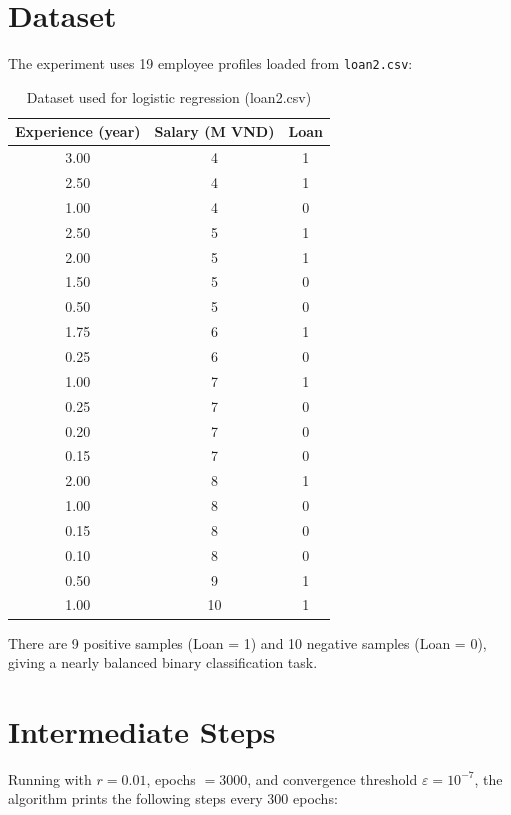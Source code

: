 \documentclass[12pt,a4paper]{article}
\begin{document}
\section{Dataset}

The experiment uses 19 employee profiles loaded from \texttt{loan2.csv}:

\begin{table}[H]
\centering
\caption{Dataset used for logistic regression (loan2.csv)}
\begin{tabular}{ccc}
\toprule
\textbf{Experience (year)} & \textbf{Salary (M VND)} & \textbf{Loan} \\
\midrule
3.00  & 4 & 1 \\
2.50  & 4 & 1 \\
1.00  & 4 & 0 \\
2.50  & 5 & 1 \\
2.00  & 5 & 1 \\
1.50  & 5 & 0 \\
0.50  & 5 & 0 \\
1.75  & 6 & 1 \\
0.25  & 6 & 0 \\
1.00  & 7 & 1 \\
0.25  & 7 & 0 \\
0.20  & 7 & 0 \\
0.15  & 7 & 0 \\
2.00  & 8 & 1 \\
1.00  & 8 & 0 \\
0.15  & 8 & 0 \\
0.10  & 8 & 0 \\
0.50  & 9 & 1 \\
1.00  & 10 & 1 \\
\bottomrule
\end{tabular}
\end{table}

There are 9 positive samples (Loan = 1) and 10 negative samples (Loan = 0), giving a nearly balanced binary classification task.

\section{Intermediate Steps}

Running with $r = 0.01$, epochs $= 3000$, and convergence threshold $\varepsilon = 10^{-7}$, the algorithm prints the following steps every 300 epochs:
\end{document}
